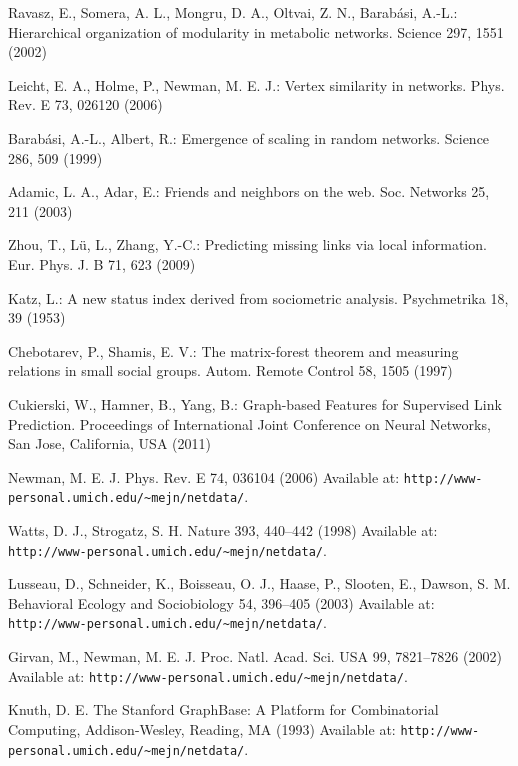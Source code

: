 \documentclass{llncs}
\begin{document}
\begin{thebibliography}{}
Ravasz, E., Somera, A. L., Mongru, D. A., Oltvai, Z. N., Barab{\'a}si, A.-L.:
Hierarchical organization of modularity in metabolic networks. 
Science 297, 1551 (2002)

Leicht, E. A., Holme, P., Newman, M. E. J.:
Vertex similarity in networks.
Phys. Rev. E 73, 026120 (2006)

Barab{\'a}si, A.-L., Albert, R.:
Emergence of scaling in random networks.
Science 286, 509 (1999)

Adamic, L. A., Adar, E.:
Friends and neighbors on the web.
Soc. Networks 25, 211 (2003)

Zhou, T., L{\"u}, L., Zhang, Y.-C.:
Predicting missing links via local information.
Eur. Phys. J. B 71, 623 (2009)

Katz, L.:
A new status index derived from sociometric analysis.
Psychmetrika 18, 39 (1953)

Chebotarev, P., Shamis, E. V.:
The matrix-forest theorem and measuring relations in small social groups.
Autom. Remote Control 58, 1505 (1997)

Cukierski, W., Hamner, B., Yang, B.:
Graph-based Features for Supervised Link Prediction.
Proceedings of International Joint Conference on Neural Networks, San Jose, California, USA (2011)

Newman, M. E. J.
Phys. Rev. E 74, 036104 (2006)
Available at: \texttt{http://www-personal.umich.edu/\~{}mejn/netdata/}.

Watts, D. J., Strogatz, S. H.
Nature 393, 440--442 (1998) 
Available at: \texttt{http://www-personal.umich.edu/\~{}mejn/netdata/}.

Lusseau, D., Schneider, K., Boisseau, O. J., Haase, P., Slooten, E., Dawson, S. M.
Behavioral Ecology and Sociobiology 54, 396--405 (2003)
Available at: \texttt{http://www-personal.umich.edu/\~{}mejn/netdata/}.

Girvan, M., Newman, M. E. J.
Proc. Natl. Acad. Sci. USA 99, 7821--7826 (2002)
Available at: \texttt{http://www-personal.umich.edu/\~{}mejn/netdata/}.

Knuth, D. E.
The Stanford GraphBase: A Platform for Combinatorial Computing, Addison-Wesley, Reading, MA (1993)
Available at: \texttt{http://www-personal.umich.edu/\~{}mejn/netdata/}.


\end{thebibliography}
\end{document}
